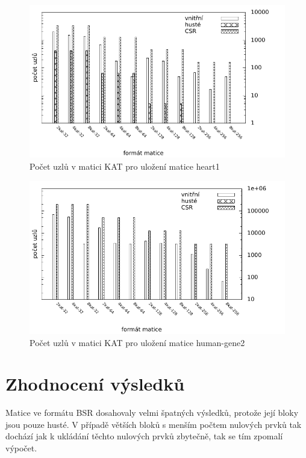 \begin{figure}[htb]
	\includegraphics[width=1.0\textwidth]{./images/measure1/kat_nodes_heart1}
	\caption{Počet uzlů v matici KAT pro uložení matice heart1}
	\label{fig:mtxsizeheart}
\end{figure}

\begin{figure}[htb]
	\includegraphics[width=1.0\textwidth]{./images/measure1/kat_nodes_human-gene2}
	\caption{Počet uzlů v matici KAT pro uložení matice human-gene2}
	\label{fig:mtxsizehuman}
\end{figure}




\section{Zhodnocení výsledků}

Matice ve formátu BSR dosahovaly velmi špatných výsledků, protože	 její bloky jsou pouze husté. V případě větších bloků s menším počtem nulových prvků tak dochází jak k ukládání těchto nulových prvků zbytečně, tak se tím zpomalí výpočet.

